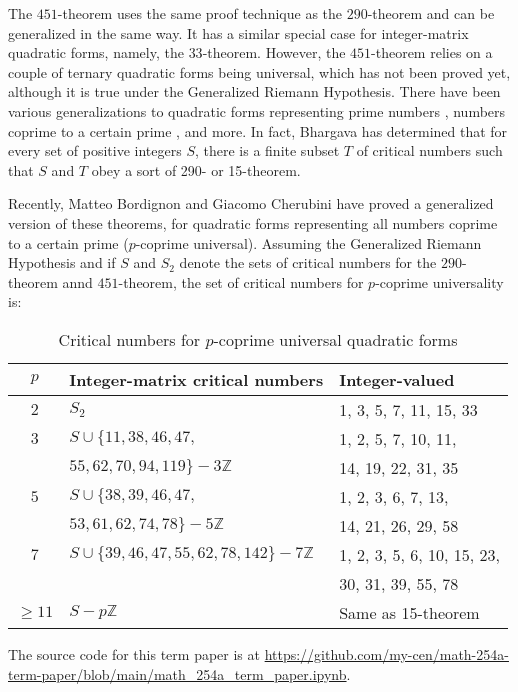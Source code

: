 \documentclass{article}
\begin{document}
The $451$-theorem uses the same proof technique as the $290$-theorem and can be generalized in the same way. It has a similar special case for integer-matrix quadratic forms, namely, the $33$-theorem. However, the $451$-theorem relies on a couple of ternary quadratic forms being universal, which has not been proved yet, although it is true under the Generalized Riemann Hypothesis. There have been various generalizations to quadratic forms representing prime numbers \cite{primeuniversaloeis}, numbers coprime to a certain prime \cite{coprimeuniv}, and more. In fact, Bhargava has determined that for every set of positive integers $S$, there is a finite subset $T$ of critical numbers such that $S$ and $T$ obey a sort of 290- or 15-theorem.

Recently, Matteo Bordignon and Giacomo Cherubini have proved a generalized version of these theorems, for quadratic forms representing all numbers coprime to a certain prime ($p$-coprime universal). Assuming the Generalized Riemann Hypothesis and if $S$ and $S_2$ denote the sets of critical numbers for the $290$-theorem annd $451$-theorem, the set of critical numbers for $p$-coprime universality is:
\begin{table}[H]
    \begin{tabular}{|c|l|l|}
        $p$ & Integer-matrix critical numbers & Integer-valued \\ \hline
        $2$ & $S_2$ & 1, 3, 5, 7, 11, 15, 33 \\ \hline
        $3$ & $S \cup \{11, 38, 46, 47,$ &  1, 2, 5, 7, 10, 11, \\
        & $55, 62, 70, 94, 119\} - 3\mathbb{Z}$ & 14, 19, 22, 31, 35 \\ \hline
        $5$ & $S \cup \{38, 39, 46, 47,$ & 1, 2, 3, 6, 7, 13, \\
        & $53, 61, 62, 74, 78\} - 5\mathbb{Z}$ & 14, 21, 26, 29, 58 \\ \hline
        $7$ & $S \cup \{39, 46, 47, 55, 62, 78, 142\} - 7\mathbb{Z}$ & 1, 2, 3, 5, 6, 10, 15, 23, \\
        && 30, 31, 39, 55, 78 \\ \hline
        $\ge 11$ & $S - p\mathbb{Z}$ & Same as 15-theorem 
    \end{tabular}
    \caption{Critical numbers for $p$-coprime universal quadratic forms}
    \label{coprimeunivtable}
\end{table}

The source code for this term paper is at \url{https://github.com/my-cen/math-254a-term-paper/blob/main/math_254a_term_paper.ipynb}.

\printbibliography
\end{document}
